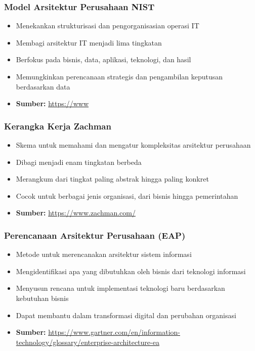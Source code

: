 \documentclass{beamer}
\begin{document}
	\begin{frame}
		\frametitle{Model Arsitektur Perusahaan NIST}
		\begin{itemize}
			\item Menekankan strukturisasi dan pengorganisasian operasi IT
			\item Membagi arsitektur IT menjadi lima tingkatan
			\item Berfokus pada bisnis, data, aplikasi, teknologi, dan hasil
			\item Memungkinkan perencanaan strategis dan pengambilan keputusan berdasarkan data
			\item \textbf{Sumber:} \url{https://www}
		\end{itemize}
	\end{frame}
	
	\begin{frame}
		\frametitle{Kerangka Kerja Zachman}
		\begin{itemize}
			\item Skema untuk memahami dan mengatur kompleksitas arsitektur perusahaan
			\item Dibagi menjadi enam tingkatan berbeda
			\item Merangkum dari tingkat paling abstrak hingga paling konkret
			\item Cocok untuk berbagai jenis organisasi, dari bisnis hingga pemerintahan
			\item \textbf{Sumber:} \url{https://www.zachman.com/}
		\end{itemize}
	\end{frame}
	
	\begin{frame}
		\frametitle{Perencanaan Arsitektur Perusahaan (EAP)}
		\begin{itemize}
			\item Metode untuk merencanakan arsitektur sistem informasi
			\item Mengidentifikasi apa yang dibutuhkan oleh bisnis dari teknologi informasi
			\item Menyusun rencana untuk implementasi teknologi baru berdasarkan kebutuhan bisnis
			\item Dapat membantu dalam transformasi digital dan perubahan organisasi
			\item \textbf{Sumber:} \url{https://www.gartner.com/en/information-technology/glossary/enterprise-architecture-ea}
		\end{itemize}
	\end{frame}
	
\end{document}
